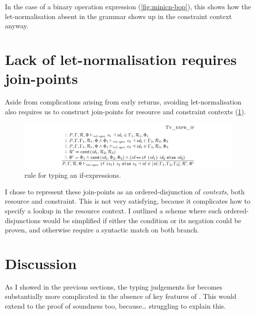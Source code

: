 In the case of a binary operation expression (\cref{fig:minicn-bop}), this
shows how the let-normalisation absent in the grammar shows up in the
constraint context anyway.

\section{Lack of let-normalisation requires join-points}

Aside from complications arising from early returns, avoiding let-normalisation
also requires us to construct join-points for resource and constraint contexts
(\cref{fig:minicn-if}).

\begin{figure}[tpb]
    \ContinuedFloat{}
    \includegraphics{figures/minicn-if}
    \caption{ rule for typing an if-expressions.}\label{fig:minicn-if}
\end{figure}

I chose to represent these join-points as an ordered-disjunction of
\emph{contexts}, both resource and constraint. This is not very satisfying,
because it complicates how to specify a lookup in the resource context. I
outlined a scheme where such ordered-disjunctions would be simplified if either
the condition or its negation could be proven, and otherwise require a
syntactic match on both branch.

\section{Discussion}

As I showed in the previous sections, the typing judgements for 
becomes substantially more complicated in the absence of key features of
. This would extend to the proof of soundness too, because\ldots
struggling to explain this.

